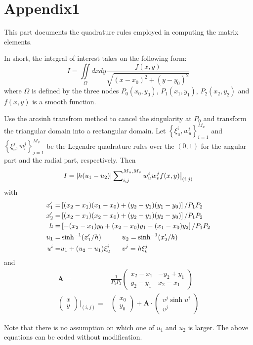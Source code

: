 \documentclass[main]{subfiles}
\begin{document}
\section{Appendix1}
\label{sec:Appendix1}
This part documents the quadrature rules employed in computing the matrix
elements. 

In short, the integral of interest takes on the following form:
\begin{equation*}
	I=\iint\limits_\Omega dx dy\frac{f(x,y)}{\sqrt{(x-x_0)^2+(y-y_0)^2}}
\end{equation*}
where $\Omega$ is defined by the three nodes
$P_0(x_0,y_0)$, $P_1(x_1,y_1)$, $P_2(x_2,y_2)$ and $f(x,y)$ is a smooth function.

Use the arcsinh transfrom method to cancel the singularity at $P_0$ and
transform the triangular domain into a rectangular domain. Let 
$\left\{\xi_u^i,w_u^i\right\}_{i=1}^{M_u}$ and 
$\left\{\xi_v^j,w_v^j\right\}_{j=1}^{M_v}$ be the Legendre quadrature rules over
the $(0,1)$ for the angular part and the radial part, respectively. Then
\begin{equation*}
	I=\left| h(u_1-u_2) \right|\sum\nolimits_{i,j}^{M_u,M_v}w_u^i w_v^j
	f(x,y)\big\vert_{(i,j)}
\end{equation*}
with
\begin{align*}
x_1^{\prime}=&\left[(x_2-x_1)(x_1-x_0)+(y_2-y_1)(y_1-y_0)\right]/P_1 P_2 \\
x_2^{\prime}=&\left[(x_2-x_1)(x_2-x_0)+(y_2-y_1)(y_2-y_0)\right]/P_1 P_2 \\
h=& \left[-(x_2-x_1)y_0+(x_2-x_0)y_1-(x_1-x_0)y_2\right]/P_1 P_2 \\
u_1=& \sinh^{-1}(x_1^{\prime}/h) \ \ \ \ \ \ \ \ \ u_2= \sinh^{-1}(x_2^{\prime}/h) \\
u^i=& u_1+(u_2-u_1)\xi_u^i \ \ \ \ \ v^j=h\xi_v^j
\end{align*}
and
\begin{align*}
	\mathbf{A} =& \frac{1}{P_1 P_2} \begin{pmatrix}
		x_2-x_1 & -y_2+y_1 \\
		y_2-y_1 & x_2-x_1
	\end{pmatrix}	\\
	\begin{pmatrix} x \\ y \end{pmatrix} \bigg\vert_{(i,j)} =&
	\begin{pmatrix} x_0 \\ y_0 \end{pmatrix} + \mathbf{A}\cdot
	\begin{pmatrix} v^j\sinh{u^i} \\ v^j \end{pmatrix}
\end{align*}

Note that there is no assumption on which one of $u_1$ and $u_2$ is larger. The
above equations can be coded without modification.
\end{document}
